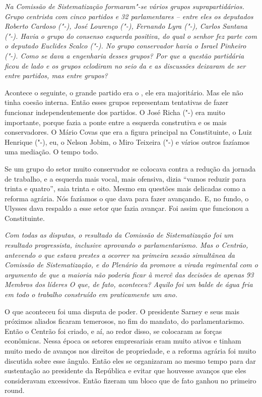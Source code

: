 \medskip

\noindent\emph{Na Comissão de Sistematização formaram"-se vários grupos
suprapartidários. Grupo centrista com cinco partidos e 32 parlamentares
-- entre eles os deputados Roberto Cardoso ("-), José
Lourenço ("-), Fernando Lyra ("-), Carlos Santana ("-).
Havia o grupo do consenso esquerda positiva, do qual o senhor fez parte
com o deputado Euclides Scalco ("-). No grupo conservador havia o
Israel Pinheiro ("-). Como se dava a engenharia desses grupos? Por
que a questão partidária ficou de lado e os grupos eclodiram no seio da
 e as discussões deixaram de ser entre partidos, mas entre grupos?}

Acontece o seguinte, o grande partido era o , ele era
majoritário. Mas ele não tinha coesão interna. Então esses grupos
representam tentativas de fazer funcionar independentemente dos
partidos. O José Richa ("-) era muito importante, porque fazia a
ponte entre a esquerda construtiva e os mais conservadores. O Mário
Covas que era a figura principal na Constituinte, o Luiz Henrique
("-), eu, o Nelson Jobim, o Miro Teixeira ("-) e vários outros
fazíamos uma mediação. O tempo todo.

Se um grupo do setor muito conservador se colocava contra a redução da
jornada de trabalho, e a esquerda mais vocal, mais ofensiva, dizia
``vamos reduzir para trinta e quatro'', saia trinta e oito. Mesmo em
questões mais delicadas como a reforma agrária. Nós fazíamos o que dava
para fazer avançando. E, no fundo, o Ulysses dava respaldo a esse setor
que fazia avançar. Foi assim que funcionou a Constituinte.

\medskip

\noindent\emph{Com todas as disputas, o resultado da Comissão de Sistematização
foi um resultado progressista, inclusive aprovando o parlamentarismo.
Mas o Centrão, antevendo o que estava prestes a ocorrer na primeira
sessão simultânea da Comissão de Sistematização, e do Plenário da 
promove a virada regimental com o argumento de que a maioria não poderia
ficar à mercê das decisões de apenas 93 Membros dos líderes O que, de
fato, aconteceu? Aquilo foi um balde de água fria em todo o trabalho
construído em praticamente um ano.}

O que aconteceu foi uma disputa de poder. O presidente
Sarney e seus mais próximos aliados ficaram temerosos, no fim do
mandato, do parlamentarismo. Então o Centrão foi criado, e aí, ao redor
disso, se colocaram as forças econômicas. Nessa época os setores
empresariais eram muito ativos e tinham muito medo de avanços nos
direitos de propriedade, e a reforma agrária foi muito discutida sobre
esse ângulo. Então eles se organizaram ao mesmo tempo para dar
sustentação ao presidente da República e evitar que houvesse avanços que
eles consideravam excessivos. Então fizeram um bloco que de fato ganhou
no primeiro round.

